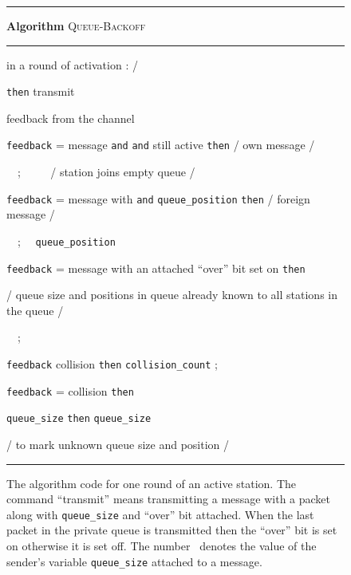 \documentclass[11pt]{article}
\newcommand{\F}{\vspace*{\smallskipamount}}
\newcommand{\FFF}{\vspace*{\bigskipamount}}
\newcommand{\B}{\vspace*{-\smallskipamount}}
\newcommand{\Item}{\B\item}
\newlength{\pagewidth}
\newlength{\captionwidth}
\begin{document}
\begin{figure}[t]
\rule{\textwidth}{0.75pt}

\F 
\textbf{Algorithm} \textsc{Queue-Backoff} 

\rule{\textwidth}{0.75pt}
\begin{center}
\begin{minipage}{\pagewidth}
\begin{description}
\Item[\rm /] in a round of activation : 
\hfill 
/
\Item[\tt if]    \texttt{then} transmit 
\Item[\tt feedback]  feedback from the channel 
\Item[\tt if] \texttt{feedback} = message \texttt{and}  \texttt{and} still active \texttt{then} 
\hfill 
/  own message  /
\begin{description}
\Item[\texttt{queue\_position}]  \ \ ; \ \  \ \ 
\hfill
/ station joins empty queue /
\end{description}
\Item[\tt if] \texttt{feedback} = message with  
		\texttt{and} \texttt{queue\_position}  \texttt{then} /  foreign message  /
\begin{description}
\Item[\texttt{queue\_size}] \ \ ; \ \ 
\texttt{queue\_position}  
\end{description}
\Item[\tt if] \texttt{feedback} = message with an attached ``over''  bit set on  \texttt{then} 

\hfill	
/ queue size and positions in queue already known to all stations in the queue /
\begin{description}
\Item[\texttt{queue\_size}] 
\ \ ; \ \ 
 
\end{description}
\Item[\tt if] \texttt{feedback}  collision \texttt{then} 
\texttt{collision\_count}  ;
\Item[\tt if] \texttt{feedback} = collision \texttt{then}
\begin{description}
\Item[\texttt{collision\_count}]  
\Item[\tt if] \texttt{queue\_size}   \texttt{then}
		 \texttt{queue\_size} 	 
\item[\tt else]   
\hfill 
/ to mark unknown queue size and position /
\end{description}
\end{description}
\end{minipage}
\FFF

\rule{\textwidth}{0.75pt}

\parbox{\captionwidth}{\caption{\label{alg:queue-backoff}
The algorithm code for one round of an active station. 
The command ``transmit'' means transmitting a message with a packet along with \texttt{queue\_size} and ``over'' bit attached.
When the last packet in the private queue is transmitted then the  ``over'' bit is set on otherwise it is set off.
The number~ denotes the value of the sender's variable \texttt{queue\_size} attached to a message.
}}
\end{center}
\end{figure}
\end{document}
